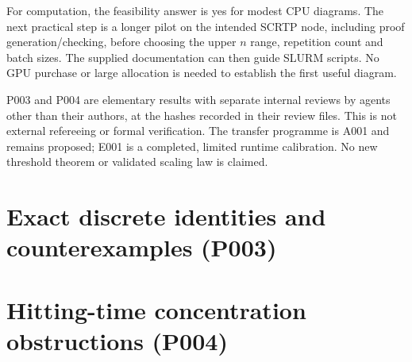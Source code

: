 \documentclass[11pt,a4paper]{article}
\begin{document}
For computation, the feasibility answer is yes for modest CPU diagrams.
The next practical step is a longer pilot on the intended SCRTP node,
including proof generation/checking, before choosing the upper $n$ range,
repetition count and batch sizes. The supplied documentation can then guide
SLURM scripts. No GPU purchase or large allocation is needed to establish
the first useful diagram.

P003 and P004 are elementary results with separate internal reviews by
agents other than their authors, at the hashes recorded in their review
files. This is not external refereeing or formal verification. The transfer
programme is A001 and remains proposed; E001 is a completed, limited runtime
calibration. No new threshold theorem or validated scaling law is claimed.

\clearpage
\appendix
\section{Exact discrete identities and counterexamples (P003)}
\label{app:cubical}

\section{Hitting-time concentration obstructions (P004)}
\label{app:analytic}

\clearpage
{}
\begingroup\small\raggedright


\endgroup
\end{document}
